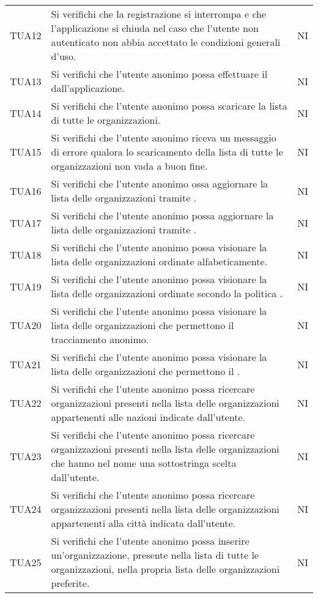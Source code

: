 {\begin{longtable}{ c C{13cm} C{1cm}}
TUA12 & Si verifichi che la registrazione si interrompa e che l'applicazione si chiuda nel caso che l'utente non autenticato non abbia accettato le condizioni generali d'uso. & NI \\
TUA13 & Si verifichi che l'utente anonimo possa effettuare il  dall'applicazione. & NI \\
TUA14 & Si verifichi che l'utente anonimo possa scaricare la lista di tutte le organizzazioni. & NI \\
TUA15 & Si verifichi che l'utente anonimo riceva un messaggio di errore qualora lo scaricamento della lista di tutte le organizzazioni non vada a buon fine. & NI \\
TUA16 & Si verifichi che l'utente anonimo ossa aggiornare la lista delle organizzazioni tramite . & NI \\
TUA17 & Si verifichi che l'utente anonimo possa aggiornare la lista delle organizzazioni tramite . & NI \\
TUA18 & Si verifichi che l'utente anonimo possa visionare la lista delle organizzazioni ordinate alfabeticamente. & NI \\
TUA19 & Si verifichi che l'utente anonimo possa visionare la lista delle organizzazioni ordinate secondo la politica . & NI \\
TUA20 & Si verifichi che l'utente anonimo possa visionare la lista delle organizzazioni che permettono il tracciamento anonimo. & NI \\
TUA21 & Si verifichi che l'utente anonimo possa visionare la lista delle organizzazioni che permettono il . & NI \\
TUA22 & Si verifichi che l'utente anonimo possa ricercare organizzazioni presenti nella lista delle organizzazioni appartenenti alle nazioni indicate dall'utente. & NI \\
TUA23 & Si verifichi che l'utente anonimo possa ricercare organizzazioni presenti nella lista delle organizzazioni che hanno nel nome una sottostringa scelta dall'utente. & NI \\
TUA24 & Si verifichi che l'utente anonimo possa ricercare organizzazioni presenti nella lista delle organizzazioni appartenenti alla città indicata dall'utente. & NI \\
TUA25 & Si verifichi che l'utente anonimo possa inserire un'organizzazione, presente nella lista di tutte le organizzazioni, nella propria lista delle organizzazioni preferite. & NI \\

\end{longtable}}
